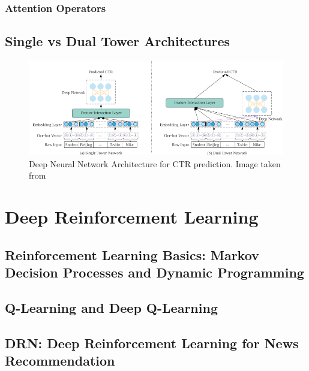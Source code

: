 \documentclass{mldsmsc}
\begin{document}
\subsubsection{Attention Operators}

\subsection{Single vs Dual Tower Architectures}


\begin{figure}[h]
\centering
\includegraphics[width=\textwidth]{../figures/single_dual_dnn.png}
\caption{Deep Neural Network Architecture for CTR prediction. Image taken from \cite{RefWorks:zhang2021deep}}
\label{fig:dnn_architecture}
\end{figure}



\section{Deep Reinforcement Learning}

\subsection{Reinforcement Learning Basics: Markov Decision Processes and Dynamic Programming}

\subsection{Q-Learning and Deep Q-Learning}

\subsection{DRN: Deep Reinforcement Learning for News Recommendation}
\end{document}
